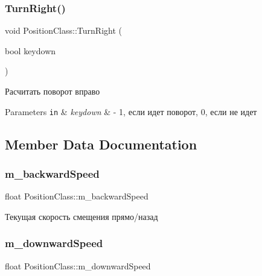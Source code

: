 \subsubsection{\texorpdfstring{Turn\+Right()}{TurnRight()}}
{\footnotesize\ttfamily void Position\+Class\+::\+Turn\+Right (\begin{DoxyParamCaption}\item[{bool}]{keydown }\end{DoxyParamCaption})}



Расчитать поворот вправо 


\begin{DoxyParams}[1]{Parameters}
\mbox{\tt in}  & {\em keydown} & -\/ 1, если идет поворот, 0, если не идет \\
\hline
\end{DoxyParams}


\subsection{Member Data Documentation}
\mbox{\label{class_position_class_a924a1e9210ce92204220ff25c56ee9b8}} 
\subsubsection{\texorpdfstring{m\+\_\+backward\+Speed}{m\_backwardSpeed}}
{\footnotesize\ttfamily float Position\+Class\+::m\+\_\+backward\+Speed\hspace{0.3cm}{\ttfamily [private]}}



Текущая скорость смещения прямо/назад 

\mbox{\label{class_position_class_a7047144c07127876870163d964778d19}} 
\subsubsection{\texorpdfstring{m\+\_\+downward\+Speed}{m\_downwardSpeed}}
{\footnotesize\ttfamily float Position\+Class\+::m\+\_\+downward\+Speed\hspace{0.3cm}{\ttfamily [private]}}



